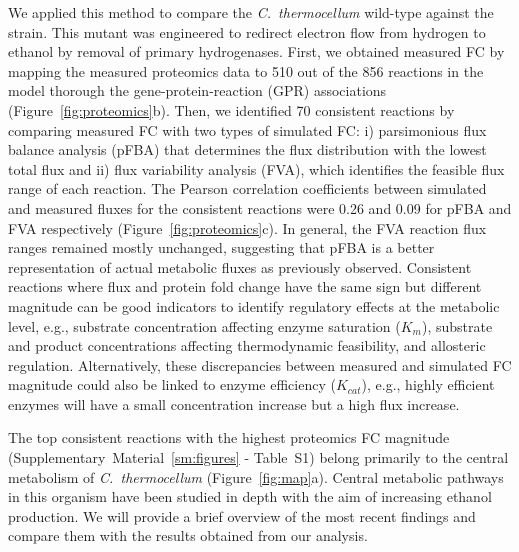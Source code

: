 We applied this method to compare the \textit{C.~thermocellum} wild-type against the  strain. This mutant was engineered to redirect electron flow from hydrogen to ethanol by removal of primary hydrogenases.\citep{biswas2015, thompson2015}
First, we obtained measured FC by mapping the measured proteomics data to 510 out of the 856 reactions in the model thorough the gene-protein-reaction (GPR) associations (Figure~\ref{fig:proteomics}b).
Then, we identified 70 consistent reactions by comparing measured FC with two types of simulated FC: i) parsimonious flux balance analysis (pFBA) that determines the flux distribution with the lowest total flux and ii) flux variability analysis (FVA), which identifies the feasible flux range of each reaction.
The Pearson correlation coefficients between simulated and measured fluxes for the consistent reactions were 0.26 and 0.09 for pFBA and FVA respectively (Figure~\ref{fig:proteomics}c).
In general, the FVA reaction flux ranges remained mostly unchanged, suggesting that pFBA is a better representation of actual metabolic fluxes as previously observed.\citep{machado2014}
Consistent reactions where flux and protein fold change have the same sign but different magnitude can be good indicators to identify regulatory effects at the metabolic level, e.g., substrate concentration affecting enzyme saturation ($K_m$), substrate and product concentrations affecting thermodynamic feasibility, and allosteric regulation. Alternatively, these discrepancies between measured and simulated FC magnitude could also be linked to enzyme efficiency ($K_{cat}$), e.g., highly efficient enzymes will have a small concentration increase  but a high flux increase.


The top consistent reactions with the highest proteomics FC magnitude (Supplementary~Material~\ref{sm:figures} - Table~S1) belong primarily to the central metabolism of \textit{C.~thermocellum} (Figure~\ref{fig:map}a). Central metabolic pathways in this organism have been studied in depth with the aim of increasing ethanol production. We will provide a brief overview of the most recent findings and compare them with the results obtained from our analysis.

